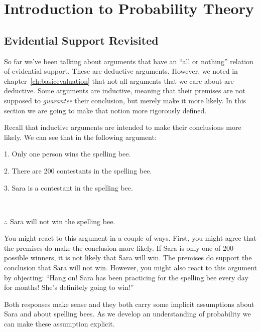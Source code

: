 \chapter{Introduction to Probability Theory}
\label{ch:introprobability}
\setlength{\parindent}{1em}

\section{Evidential Support Revisited}

So far we've been talking about arguments that have an ``all or nothing'' relation of evidential support. These are deductive arguments. However, we noted in chapter~\ref{ch:basicevaluation} that not all arguments that we care about are deductive. Some arguments are inductive, meaning that their premises are not supposed to \emph{guarantee} their conclusion, but merely make it more likely. In this section we are going to make that notion more rigorously defined.

Recall that inductive arguments are intended to make their conclusions more likely. We can see that in the following argument:

\begin{earg}
\item[1.] Only one person wins the spelling bee.
\item[2.] There are 200 contestants in the spelling bee.
\item[3.] Sara is a contestant in the spelling bee.
\item[] \textcolor{white}{.}\sout{\hspace{.8\linewidth}}\textcolor{white}{.}
\item[$\therefore$] Sara will not win the spelling bee.
\end{earg}

You might react to this argument in a couple of ways. First, you might agree that the premises do make the conclusion more likely. If Sara is only one of 200 possible winners, it is not likely that Sara will win. The premises do support the conclusion that Sara will not win. However, you might also react to this argument by objecting: ``Hang on! Sara has been practicing for the spelling bee every day for months! She's definitely going to win!''

Both responses make sense and they both carry some implicit assumptions about Sara and about spelling bees. As we develop an understanding of probability we can make these assumption explicit.

